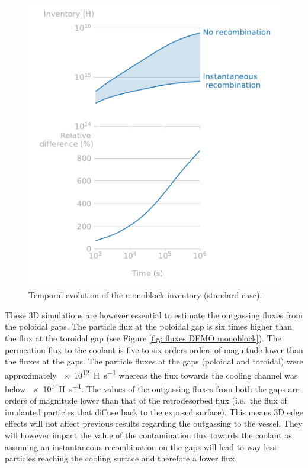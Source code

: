 \begin{figure} [h]
    \centering
    \includegraphics[width=\linewidth]{Figures/Chapter3/monoblocks/3D_monoblocks/inventory_standard_case_w_wo_recomb.pdf}
    \caption{Temporal evolution of the monoblock inventory (standard case).}
    \label{fig: inventory vs time DEMO monoblock}
\end{figure}

These 3D simulations are however essential to estimate the outgassing fluxes from the poloidal gaps.
The particle flux at the poloidal gap is six times higher than the flux at the toroidal gap  (see Figure \ref{fig: fluxes DEMO monoblock}).
The permeation flux to the coolant is five to six orders orders of magnitude lower than the fluxes at the gaps.
The particle fluxes at the gaps (poloidal and toroidal) were approximately \SI{e12}{H.s^{-1}} whereas the flux towards the cooling channel was below \SI{e7}{H.s^{-1}}.
The values of the outgassing fluxes from both the gaps are orders of magnitude lower than that of the retrodesorbed flux (i.e.\ the flux of implanted particles that diffuse back to the exposed surface).
This means 3D edge effects will not affect previous results regarding the outgassing to the vessel.
They will however impact the value of the contamination flux towards the coolant as assuming an instantaneous recombination on the gaps will lead to way less particles reaching the cooling surface and therefore a lower flux.

